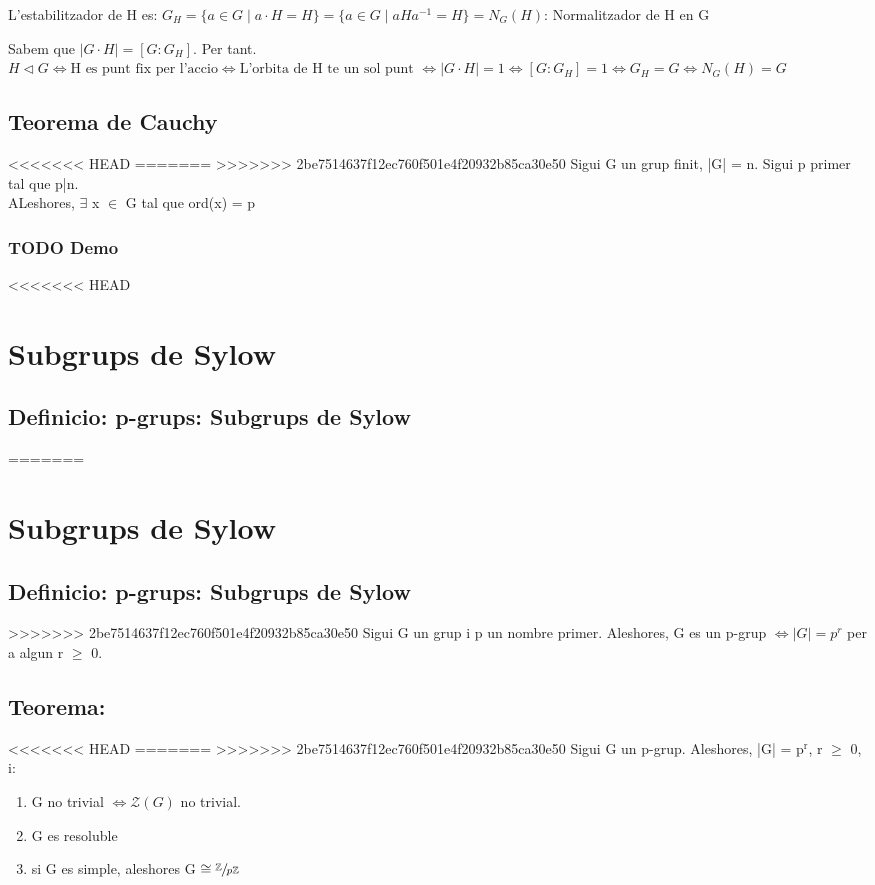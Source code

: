 \documentclass[11pt]{article}
\begin{document}
L'estabilitzador de H es: \(G_H = \{a \in G \mid a \cdot H = H \} = \{ a \in G \mid aHa^{-1} = H \} = N_{G}(H)\): Normalitzador de H en G


Sabem que \(\lvert G \cdot H\rvert = [G : G_H ].\) Per tant. \\
\(H \vartriangleleft G \iff \text{H es punt fix per l'accio} \iff \text{L'orbita de H te un sol punt } \iff \lvert G \cdot H \rvert = 1 \iff [G : G_H] = 1 \iff G_H = G \iff N_{G}(H) = G\)

\subsection{Teorema de Cauchy}
<<<<<<< HEAD
\label{sec:orgeb5bce2}
=======
\label{sec:orgbb30ebe}
>>>>>>> 2be7514637f12ec760f501e4f20932b85ca30e50
Sigui G un grup finit, |G| = n. Sigui p primer tal que p|n. \\
ALeshores, \(\exists\) x \(\in\) G tal que ord(x) = p

\subsubsection{{\bfseries\sffamily TODO} Demo}
<<<<<<< HEAD
\label{sec:org9c09767}

\section{Subgrups de Sylow}
\label{sec:org7924268}

\subsection{Definicio: p-grups: Subgrups de Sylow}
\label{sec:orgcbded7c}
=======
\label{sec:org43b2bcd}

\section{Subgrups de Sylow}
\label{sec:orgaba3b03}

\subsection{Definicio: p-grups: Subgrups de Sylow}
\label{sec:org8310795}
>>>>>>> 2be7514637f12ec760f501e4f20932b85ca30e50
Sigui G un grup i p un nombre primer. Aleshores,  G es un p-grup
\(\iff \lvert G \rvert = p^r\) per a algun r \(\ge\) 0.

\subsection{Teorema:}
<<<<<<< HEAD
\label{sec:orgd6cfd85}
=======
\label{sec:org27dbbf4}
>>>>>>> 2be7514637f12ec760f501e4f20932b85ca30e50
Sigui G un p-grup. Aleshores, |G| = p\(^{\text{r}}\), r \(\ge\) 0, i:
\begin{enumerate}
\item G no trivial \(\iff \mathcal{Z}(G)\) no trivial.
\item G es resoluble
\item si G es simple, aleshores G \(\cong \sfrac{\mathbb{Z}}{p\mathbb{Z}}\)
\end{enumerate}
\end{document}
